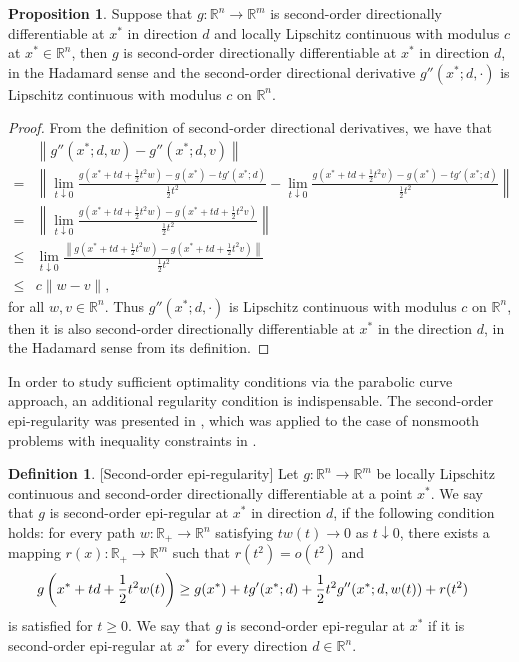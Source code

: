 \documentclass[11pt]{article}
\theoremstyle{definition}
\newtheorem{definition}[theorem]{Definition}
\newtheorem{proposition}[theorem]{Proposition}
\theoremstyle{remark}
\numberwithin{equation}{section}
\begin{document}
\begin{proposition}\label{prop lipschitz--Hadamard directional differentiable}
  Suppose that $g:\mathbb{R}^n\to \mathbb{R}^m$ is second-order directionally
differentiable at $x^*$ in direction $d$ and locally Lipschitz continuous
 with  modulus $c$ at $x^*\in\mathbb{R}^n$, then $g$ is second-order directionally differentiable at $x^*$ in
direction $d$, in the Hadamard sense and
the second-order directional derivative $g''(x^*;d,\cdot)$ is Lipschitz continuous with modulus $c$ on $\mathbb{R}^n$.
\end{proposition}
\begin{proof}
From the definition of second-order directional derivatives, we have that
  \begin{align*}
    &\left\|g''(x^*;d,w)-g''(x^*;d,v)\right\|\\
=&\left\|\lim_{t\downarrow 0}\frac{g(x^*+td
+\frac{1}{2}t^2w)-g(x^*)-tg'(x^*;d)}{\frac{1}{2}t^2}-\lim_{t\downarrow
0}\frac{g(x^*+td+\frac{1}{2}t^2v)-g(x^*)-tg'(x^*;d)}{\frac{1}{2}t^2}\right\|\\
= &\left\|\lim_{t\downarrow0}\frac{g(x^*+td+\frac{1}{2}t^2w)-g(x^*+td+\frac{1}{2}t^2v)}{\frac{1}{2}t^2}\right\|\\
\leq& \lim_{t\downarrow
0}\frac{\left\|g(x^*+td+\frac{1}{2}t^2w)-g(x^*+td+\frac{1}{2}t^2v)\right\|}{\frac{1}{2}t^2}\\
\le& c\|w-v\|,
  \end{align*}
  for all $w,v\in \mathbb{R}^n$.
 Thus $g''(x^*;d,\cdot)$ is Lipschitz continuous with modulus $c$ on $\mathbb{R}^n$, then
 it is also second-order
 directionally differentiable at $x^*$ in the direction $d$, in the Hadamard sense from its definition.
\end{proof}


In order to study sufficient optimality conditions  via the parabolic curve approach, an additional regularity condition is indispensable.
The second-order epi-regularity was presented in \cite[Definition 3.94]{Bonnans}, which was applied to the case of nonsmooth problems with inequality constraints in \cite[Proposition 2.1]{Ruckmann}.

 \begin{definition}\label{def Second-order epi-regular}[Second-order epi-regularity]
Let $g:\mathbb{R}^n\to \mathbb{R}^m$ be locally Lipschitz continuous and second-order directionally differentiable at a point $x^*$.
   We say that $g$ is second-order epi-regular at $x^*$ in
  direction $d$, if the following condition holds: for
every path $w:\mathbb{R}_{+}\to \mathbb{R}^n$ satisfying $tw(t)\to 0$ as $t\downarrow 0$, there exists  a mapping $r(x):\mathbb{R}_{+}\to \mathbb{R}^m$ such that
$r(t^2)=o(t^2)$ and
\begin{align}
  & g\left(x^*+td+\frac{1}{2}t^2w(t)\right)\ge g(x^*)+tg'(x^*;d)+\frac{1}{2}t^2g''(x^*;d,w(t))+r(t^2)\notag
\end{align}
is satisfied for $t\ge 0$. We say that $g$ is second-order epi-regular at $x^*$
if it
is second-order epi-regular at $x^*$ for every direction $d\in\mathbb{R}^n$.
\end{definition}
\end{document}
